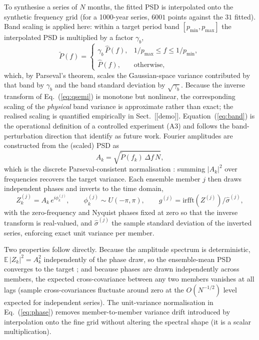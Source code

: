 To synthesise a series of $N$ months, the fitted PSD is
interpolated onto the synthetic frequency grid (for a 1000-year series,
$6001$ points against the $31$ fitted). Band scaling is applied here:
within a target period band $[p_{\min},p_{\max}]$ the interpolated PSD is
multiplied by a factor $\gamma_b$,
\begin{equation}\label{eq:band}
  \tilde P(f)=
  \begin{cases}
    \gamma_b\,\hat P(f), & 1/p_{\max}\le f \le 1/p_{\min},\\[2pt]
    \hat P(f), & \text{otherwise},
  \end{cases}
\end{equation}
which, by Parseval's theorem, scales the Gaussian-space variance contributed
by that band by $\gamma_b$ and the band standard deviation by
$\sqrt{\gamma_b}$. Because the inverse transform of Eq.~(\ref{eq:qsemi}) is
monotone but nonlinear, the corresponding scaling of the \emph{physical}
band variance is approximate rather than exact; the realised scaling is
quantified empirically in Sect.~[[demo]]. Equation~(\ref{eq:band}) is the
operational definition of a controlled experiment (A3) and follows the
band-perturbation direction that \citet{muruganandham2023} identify as
future work. Fourier amplitudes are constructed from the (scaled) PSD as
\begin{equation}\label{eq:amp}
  A_k=\sqrt{\tilde P(f_k)\,\Delta f\,N},
\end{equation}
which is the discrete Parseval-consistent normalisation
\citep{percival1993}: summing $|A_k|^2$ over frequencies recovers the target
variance. Each ensemble member $j$ then draws independent phases and inverts
to the time domain,
\begin{equation}\label{eq:phase}
  Z_k^{(j)}=A_k\,e^{i\phi_k^{(j)}},\qquad
  \phi_k^{(j)}\sim U(-\pi,\pi),\qquad
  g^{(j)}=\mathrm{irfft}\!\left(Z^{(j)}\right)\big/\hat\sigma^{(j)},
\end{equation}
with the zero-frequency and Nyquist phases fixed at zero so that the inverse
transform is real-valued, and $\hat\sigma^{(j)}$ the sample standard
deviation of the inverted series, enforcing exact unit variance per member.

Two properties follow directly. Because the amplitude spectrum is
deterministic, $\mathbb{E}\,|Z_k|^2=A_k^2$ independently of the phase draw,
so the ensemble-mean PSD converges to the target
\citep{theiler1992,schreiber2000}; and because phases are drawn
independently across members, the expected cross-covariance between any two
members vanishes at all lags (sample cross-covariances fluctuate around zero
at the $O(N^{-1/2})$ level expected for independent series). The
unit-variance normalisation in Eq.~(\ref{eq:phase}) removes member-to-member
variance drift introduced by interpolation onto the fine grid without
altering the spectral shape (it is a scalar multiplication).

